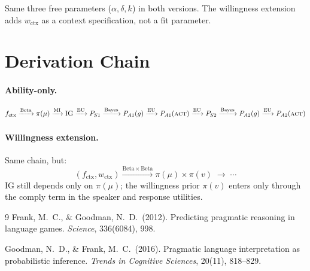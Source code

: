 \documentclass[11pt]{article}
\begin{document}
Same three free parameters ($\alpha, \delta, k$) in both versions.
The willingness extension adds $w_{\text{ctx}}$ as a context specification, not
a fit parameter.

\section{Derivation Chain}

\paragraph{Ability-only.}
\[
  f_{\text{ctx}}
  \xrightarrow{\mathrm{Beta}}
  \pi(\mu)
  \xrightarrow{\mathrm{MI}}
  \mathrm{IG}
  \xrightarrow{\mathrm{EU}}
  P_{S1}
  \xrightarrow{\mathrm{Bayes}}
  P_{A1}(g)
  \xrightarrow{\mathrm{EU}}
  P_{A1}(\textsc{act})
  \xrightarrow{\mathrm{EU}}
  P_{S2}
  \xrightarrow{\mathrm{Bayes}}
  P_{A2}(g)
  \xrightarrow{\mathrm{EU}}
  P_{A2}(\textsc{act})
\]

\paragraph{Willingness extension.} Same chain, but:
\[
  (f_{\text{ctx}}, w_{\text{ctx}})
  \xrightarrow{\mathrm{Beta}\times\mathrm{Beta}}
  \pi(\mu)\times\pi(v)
  \;\longrightarrow\; \cdots
\]
IG still depends only on $\pi(\mu)$; the willingness prior $\pi(v)$ enters only
through the comply term in the speaker and response utilities.

\bigskip
\begin{thebibliography}{9}
Frank, M.\ C., \& Goodman, N.\ D.\ (2012).
Predicting pragmatic reasoning in language games.
\textit{Science}, 336(6084), 998.

Goodman, N.\ D., \& Frank, M.\ C.\ (2016).
Pragmatic language interpretation as probabilistic inference.
\textit{Trends in Cognitive Sciences}, 20(11), 818--829.

\end{thebibliography}
\end{document}

